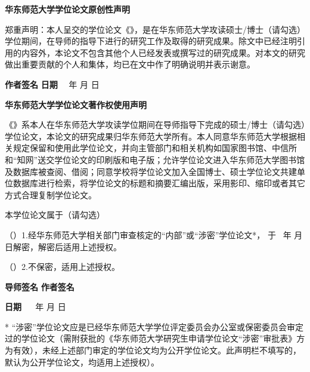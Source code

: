 \newpage
\pagestyle{empty}
\centerline{\bf\Large 华东师范大学学位论文原创性声明}

\vskip 1cm

\normalsize \indent
郑重声明：本人呈交的学位论文《{\thesisTitleNoWrap}》，是在华东师范大学攻读硕士/博士（请勾选）学位期间，在导师的指导下进行的研究工作及取得的研究成果。除文中已经注明引用的内容外，本论文不包含其他个人已经发表或撰写过的研究成果。对本文的研究做出重要贡献的个人和集体，均已在文中作了明确说明并表示谢意。

\vskip 1cm


\textbf {作者签名} \qquad\qquad \qquad\qquad \qquad\qquad\qquad\qquad\textbf{日期} ~~\qquad 年 \qquad 月 \qquad 日


\vskip 1cm

\centerline{\bf\Large 华东师范大学学位论文著作权使用声明}

\vskip 1cm

《{\thesisTitleNoWrap}》系本人在华东师范大学攻读学位期间在导师指导下完成的硕士/博士（请勾选）学位论文，本论文的研究成果归华东师范大学所有。本人同意华东师范大学根据相关规定保留和使用此学位论文，并向主管部门和相关机构如国家图书馆、中信所和“知网”送交学位论文的印刷版和电子版；允许学位论文进入华东师范大学图书馆及数据库被查阅、借阅；同意学校将学位论文加入全国博士、硕士学位论文共建单位数据库进行检索，将学位论文的标题和摘要汇编出版，采用影印、缩印或者其它方式合理复制学位论文。

本学位论文属于（请勾选）

（\quad）1.经华东师范大学相关部门审查核定的“内部”或“涉密”学位论文*，
于 ~\qquad 年 \qquad 月 \qquad 日解密，解密后适用上述授权。

（\quad）2.不保密，适用上述授权。

\vskip 0.5cm

\textbf {导师签名} \qquad\qquad \qquad\qquad \qquad\qquad\qquad\qquad\textbf{作者签名} 


\vskip 0.5cm
\begin{flushright}
\textbf{日期} ~~ \qquad 年 \qquad  月 \qquad  日 \qquad
\end{flushright}


\vskip 0.5cm

* “涉密”学位论文应是已经华东师范大学学位评定委员会办公室或保密委员会审定过的学位论文（需附获批的《华东师范大学研究生申请学位论文“涉密”审批表》方为有效），未经上述部门审定的学位论文均为公开学位论文。此声明栏不填写的，默认为公开学位论文，均适用上述授权）。
